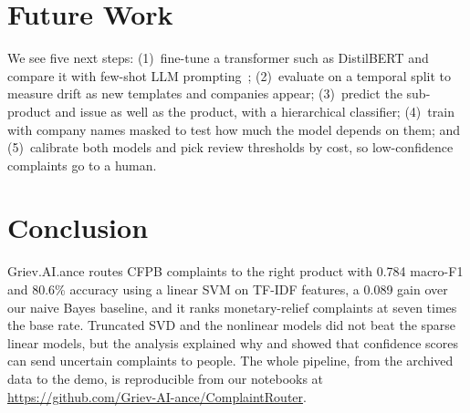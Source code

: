 \documentclass[conference]{IEEEtran}
\begin{document}
\section{Future Work}
We see five next steps: (1)~fine-tune a transformer such as DistilBERT and compare it with few-shot LLM prompting~\cite{pradhan}; (2)~evaluate on a temporal split to measure drift as new templates and companies appear; (3)~predict the sub-product and issue as well as the product, with a hierarchical classifier; (4)~train with company names masked to test how much the model depends on them; and (5)~calibrate both models and pick review thresholds by cost, so low-confidence complaints go to a human.

\section{Conclusion}
Griev.AI.ance routes CFPB complaints to the right product with 0.784 macro-F1 and 80.6\% accuracy using a linear SVM on TF-IDF features, a 0.089 gain over our naive Bayes baseline, and it ranks monetary-relief complaints at seven times the base rate. Truncated SVD and the nonlinear models did not beat the sparse linear models, but the analysis explained why and showed that confidence scores can send uncertain complaints to people. The whole pipeline, from the archived data to the demo, is reproducible from our notebooks at \url{https://github.com/Griev-AI-ance/ComplaintRouter}.
\end{document}
